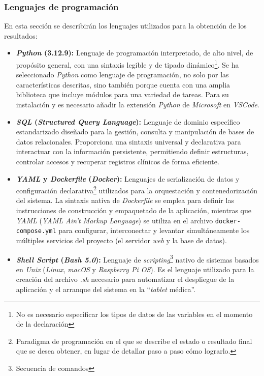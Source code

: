 \subsubsection{Lenguajes de programación}
En esta sección se describirán los lenguajes utilizados para la obtención de los resultados:

\begin{itemize}
    \item \textbf{\textit{Python} (3.12.9):} Lenguaje de programación interpretado, de alto nivel, de propósito general, con una sintaxis legible y de tipado dinámico\footnote{No es necesario especificar los tipos de datos de las variables en el momento de la declaración}. Se ha seleccionado \textit{Python} como lenguaje de programación, no solo por las características descritas, sino también porque cuenta con una amplia biblioteca que incluye módulos para una variedad de tareas. Para su instalación \cite{python} y es necesario añadir la extensión \textit{Python} de \textit{Microsoft} en \textit{VSCode}.
    
    \item \textbf{\textit{SQL} (\textit{Structured Query Language}):} Lenguaje de dominio específico estandarizado diseñado para la gestión, consulta y manipulación de bases de datos relacionales. Proporciona una sintaxis universal y declarativa para interactuar con la información persistente, permitiendo definir estructuras, controlar accesos y recuperar registros clínicos de forma eficiente. \cite{sql}
    
    \item \textbf{\textit{YAML} y \textit{Dockerfile} (\textit{Docker}):} Lenguajes de serialización de datos y configuración declarativa\footnote{Paradigma de programación en el que se describe el estado o resultado final que se desea obtener, en lugar de detallar paso a paso cómo lograrlo.} utilizados para la orquestación y contenedorización del sistema. La sintaxis nativa de \textit{Dockerfile} se emplea para definir las instrucciones de construcción y empaquetado de la aplicación, mientras que \textit{YAML} (\textit{YAML Ain't Markup Language}) se utiliza en el archivo \texttt{docker-compose.yml} para configurar, interconectar y levantar simultáneamente los múltiples servicios del proyecto (el servidor \textit{web} y la base de datos). \cite{yaml}

    \item \textbf{\textit{Shell Script} (\textit{Bash 5.0}):} Lenguaje de \textit{scripting}\footnote{Secuencia de comandos} nativo de sistemas basados en \textit{Unix} (\textit{Linux}, \textit{macOS} y \textit{Raspberry Pi OS}). Es el lenguaje utilizado para la creación del archivo \textit{.sh} necesario para automatizar el despliegue de la aplicación y el arranque del sistema en la ``\textit{tablet} médica''. \cite{shell}
\end{itemize}

